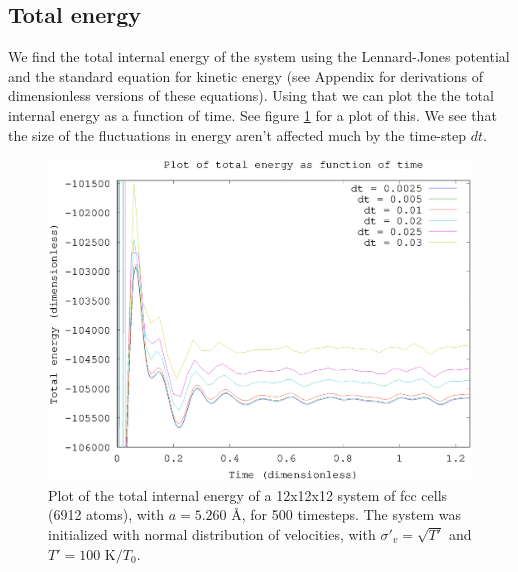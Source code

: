 \subsection*{Total energy}
We find the total internal energy of the system using the Lennard-Jones potential and the standard equation for kinetic energy (see Appendix for derivations of dimensionless versions of these equations). Using that we can plot the the total internal energy as a function of time. See figure \ref{fig:j} for a plot of this. We see that the size of the fluctuations in energy aren't affected much by the time-step $dt$.
\begin{figure}[h!]
    \centering
    \includegraphics[width =.70\textwidth]{bilder/j_plot01.eps}
    \parbox{4in} {
        \caption{
            \small{
                Plot of the total internal energy of a 12x12x12 system of fcc cells (6912 atoms), with $a = 5.260$ \AA, for 500 timesteps. The system was initialized with normal distribution of velocities, with $\sigma'_v = \sqrt{T'}$ and $T' = 100$ K$/T_0$.
            }
            \label{fig:j}
        }
    }
\end{figure}


